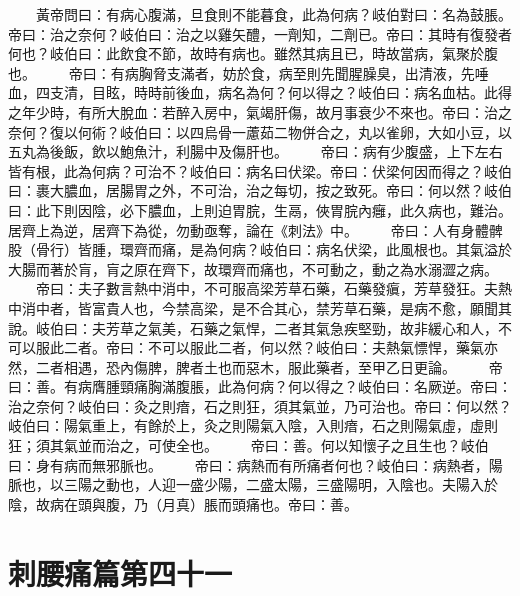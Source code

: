 　　黃帝問曰：有病心腹滿，旦食則不能暮食，此為何病？岐伯對曰：名為鼓脹。帝曰：治之奈何？岐伯曰：治之以雞矢醴，一劑知，二劑已。帝曰：其時有復發者何也？岐伯曰：此飲食不節，故時有病也。雖然其病且已，時故當病，氣聚於腹也。
　　帝曰：有病胸脅支滿者，妨於食，病至則先聞腥臊臭，出清液，先唾血，四支清，目眩，時時前後血，病名為何？何以得之？岐伯曰：病名血枯。此得之年少時，有所大脫血：若醉入房中，氣竭肝傷，故月事衰少不來也。帝曰：治之奈何？復以何術？岐伯曰：以四烏骨一藘茹二物併合之，丸以雀卵，大如小豆，以五丸為後飯，飲以鮑魚汁，利腸中及傷肝也。
　　帝曰：病有少腹盛，上下左右皆有根，此為何病？可治不？岐伯曰：病名曰伏梁。帝曰：伏梁何因而得之？岐伯曰：裹大膿血，居腸胃之外，不可治，治之每切，按之致死。帝曰：何以然？岐伯曰：此下則因陰，必下膿血，上則迫胃脘，生鬲，俠胃脘內癰，此久病也，難治。居齊上為逆，居齊下為從，勿動亟奪，論在《刺法》中。
　　帝曰：人有身體髀股（骨行）皆腫，環齊而痛，是為何病？岐伯曰：病名伏梁，此風根也。其氣溢於大腸而著於肓，肓之原在齊下，故環齊而痛也，不可動之，動之為水溺澀之病。
　　帝曰：夫子數言熱中消中，不可服高梁芳草石藥，石藥發瘨，芳草發狂。夫熱中消中者，皆富貴人也，今禁高梁，是不合其心，禁芳草石藥，是病不愈，願聞其說。岐伯曰：夫芳草之氣美，石藥之氣悍，二者其氣急疾堅勁，故非緩心和人，不可以服此二者。帝曰：不可以服此二者，何以然？岐伯曰：夫熱氣慓悍，藥氣亦然，二者相遇，恐內傷脾，脾者土也而惡木，服此藥者，至甲乙日更論。
　　帝曰：善。有病膺腫頸痛胸滿腹脹，此為何病？何以得之？岐伯曰：名厥逆。帝曰：治之奈何？岐伯曰：灸之則瘖，石之則狂，須其氣並，乃可治也。帝曰：何以然？岐伯曰：陽氣重上，有餘於上，灸之則陽氣入陰，入則瘖，石之則陽氣虛，虛則狂；須其氣並而治之，可使全也。
　　帝曰：善。何以知懷子之且生也？岐伯曰：身有病而無邪脈也。
　　帝曰：病熱而有所痛者何也？岐伯曰：病熱者，陽脈也，以三陽之動也，人迎一盛少陽，二盛太陽，三盛陽明，入陰也。夫陽入於陰，故病在頭與腹，乃（月真）脹而頭痛也。帝曰：善。

\section{刺腰痛篇第四十一}

